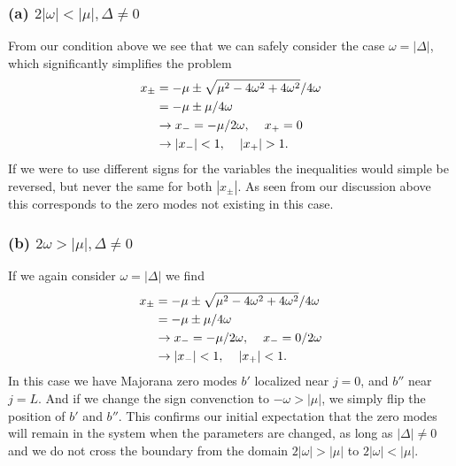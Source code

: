 \subsubsection{(a) $2|\omega| < |\mu|, \Delta \neq 0$}
From our condition above we see that we can safely consider the case $\omega = |\Delta|$, which significantly simplifies the problem
\begin{align}
    x_\pm &= \frac{-\mu \pm \sqrt{\mu^2 - 4 \omega^2 + 4 \omega^2}}{4 \omega}\\
    &= \frac{-\mu \pm \mu }{4\omega}\\
    &\to x_- = \frac{-\mu}{2\omega}, \hspace{4mm} x_+ = 0\\
    &\to |x_-| < 1, \hspace{4mm} |x_+| > 1.
\end{align}
If we were to use different signs for the variables the inequalities would simple be reversed, but never the same for both $|x_\pm|$. As seen from our discussion above this corresponds to the zero modes not existing in this case. 

\subsubsection{(b) $2\omega > |\mu|, \Delta \neq 0$}
If we again consider $\omega = |\Delta|$ we find
\begin{align}
    x_\pm &= \frac{-\mu \pm \sqrt{\mu^2 - 4 \omega^2 + 4 \omega^2}}{4 \omega}\\
    &= \frac{-\mu \pm \mu }{4\omega}\\
    &\to x_- = \frac{-\mu}{2\omega}, \hspace{4mm} x_- = \frac{0}{2\omega}\\
    &\to |x_-| < 1, \hspace{4mm} |x_+| < 1.
\end{align}
In this case we have Majorana zero modes $b'$ localized near $j=0$, and $b''$ near $j = L$. And if we change the sign convenction to $-\omega > |\mu|$, we simply flip the position of $b'$ and $b''$. This confirms our initial expectation that the zero modes will remain in the system when the parameters are changed, as long as $|\Delta| \neq 0$ and we do not cross the boundary from the domain $2|\omega| > |\mu|$ to $2|\omega| < |\mu|$.



